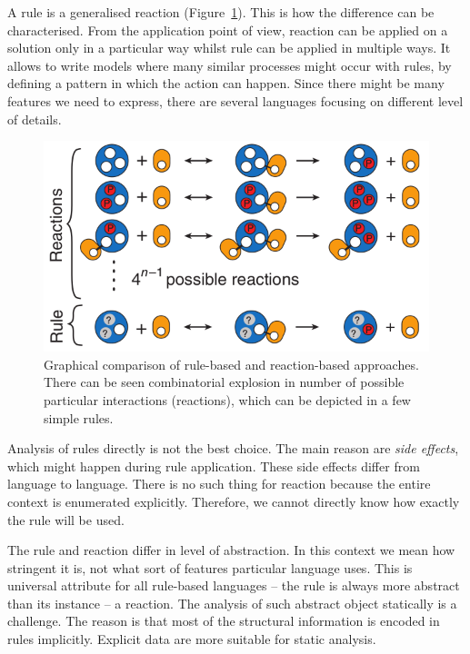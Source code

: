 \documentclass[12pt]{fithesis2}
\begin{document}
A rule is a generalised reaction (Figure~\ref{reaction_vs_rule}). This is how the difference can be characterised. From the application point of view, reaction can be applied on a solution only in a particular way whilst rule can be applied in multiple ways. It allows to write models where many similar processes might occur with rules, by defining a pattern in which the action can happen. Since there might be many features we need to express, there are several languages focusing on different level of details.

\begin{figure}[!h]
\begin{center}
\includegraphics[scale=0.5]{pics/reaction_vs_rule}
\end{center}
\caption{Graphical comparison of rule-based and reaction-based approaches. There can be seen combinatorial explosion in number of possible particular interactions (reactions), which can be depicted in a few simple rules.}\label{reaction_vs_rule}
\end{figure}

Analysis of rules directly is not the best choice. The main reason are \emph{side effects}, which might happen during rule application. These side effects differ from language to language. There is no such thing for reaction because the entire context is enumerated explicitly. Therefore, we cannot directly know how exactly the rule will be used.

The rule and reaction differ in level of abstraction. In this context we mean how stringent it is, not what sort of features particular language uses. This is universal attribute for all rule-based languages -- the rule is always more abstract than its instance -- a reaction. The analysis of such abstract object statically is a challenge. The reason is that most of the structural information is encoded in rules implicitly. Explicit data are more suitable for static analysis.
\end{document}

